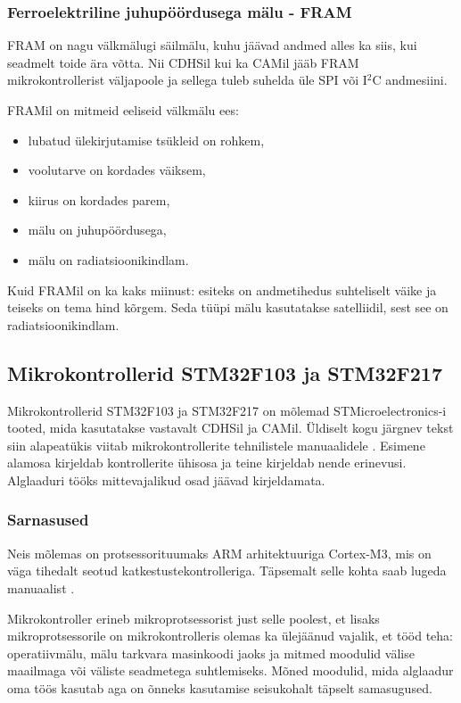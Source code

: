 \documentclass[12pt,a4paper]{article}
\newcommand{\iic}{I${}^2$C }
\begin{document}
\subsubsection{Ferroelektriline juhupöördusega mälu - FRAM}
FRAM on nagu välkmälugi säilmälu, kuhu jäävad andmed alles ka siis, kui seadmelt
toide ära võtta. Nii CDHSil kui ka CAMil jääb FRAM mikrokontrollerist väljapoole
ja sellega tuleb suhelda üle SPI või \iic andmesiini.

FRAMil on mitmeid eeliseid välkmälu ees:
\begin{itemize}
	\item lubatud ülekirjutamise tsükleid on rohkem,
	\item voolutarve on kordades väiksem,
	\item kiirus on kordades parem,
	\item mälu on juhupöördusega,
	\item mälu on radiatsioonikindlam.
\end{itemize}
Kuid FRAMil on ka kaks miinust: esiteks on andmetihedus suhteliselt väike ja teiseks
on tema hind kõrgem. Seda tüüpi mälu kasutatakse satelliidil, sest see on
radiatsioonikindlam. \cite{fram}

\subsection{Mikrokontrollerid STM32F103 ja STM32F217}
\label{sec:mcu}
Mikrokontrollerid STM32F103 ja STM32F217 on mõlemad STMicroelectronics-i tooted,
mida kasutatakse vastavalt CDHSil ja CAMil. Üldiselt kogu järgnev tekst siin
alapeatükis viitab mikrokontrollerite tehnilistele manuaalidele
\cite{f1rm,f2rm}. Esimene alamosa kirjeldab kontrollerite ühisosa ja teine
kirjeldab nende erinevusi. Alglaaduri tööks mittevajalikud osad jäävad
kirjeldamata.
\subsubsection{Sarnasused}
Neis mõlemas on protsessorituumaks ARM arhitektuuriga Cortex-M3, mis on väga
tihedalt seotud katkestustekontrolleriga. Täpsemalt selle kohta saab lugeda
manuaalist \cite{CM3pm}.

Mikrokontroller erineb mikroprotsessorist just selle poolest, et lisaks
mikroprotsessorile on mikrokontrolleris olemas ka ülejäänud vajalik, et tööd
teha: operatiivmälu, mälu tarkvara masinkoodi jaoks ja mitmed moodulid välise
maailmaga või väliste seadmetega suhtlemiseks. Mõned moodulid, mida alglaadur
oma töös kasutab aga on õnneks kasutamise seisukohalt täpselt samasugused.
\end{document}

